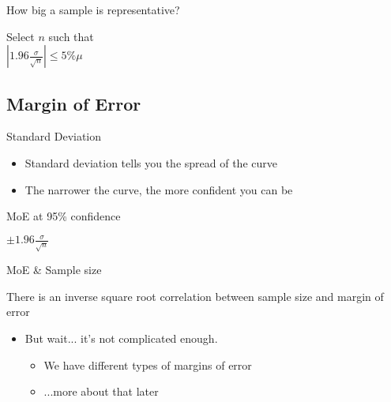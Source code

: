 \documentclass{beamer}
\begin{document}
\begin{frame}{How big a sample is representative?}
  \begin{center}
  Select \(n\) such that \\
  \medskip
  \Large{\( \left| 1.96\frac{\sigma}{\sqrt{n}} \right| \le 5\% \mu \)}
  \end{center}
\end{frame}

\subsection{Margin of Error}

\begin{frame}{Standard Deviation}
  \begin{itemize}
  \item Standard deviation tells you the spread of the curve
  \item The narrower the curve, the more confident you can be
  \end{itemize}
  \parbox[c][0.58\paperheight]{\paperwidth}{ }
\end{frame}


\begin{frame}{MoE at 95\% confidence}
  \begin{center}
  \Large{\( \pm 1.96\frac{\sigma}{\sqrt{n}} \)}
  \end{center}
\end{frame}

\begin{frame}{MoE \& Sample size}
  \begin{center}
  There is an inverse square root correlation between sample size and margin of error
  \end{center}
\end{frame}

\begin{frame}{}
  \begin{itemize}
  \item But wait... it's not complicated enough.
    \begin{itemize}
    \item<2-> We have different types of margins of error
    \item<3-> ...more about that later
    \end{itemize}
  \end{itemize}
\end{frame}
\end{document}
